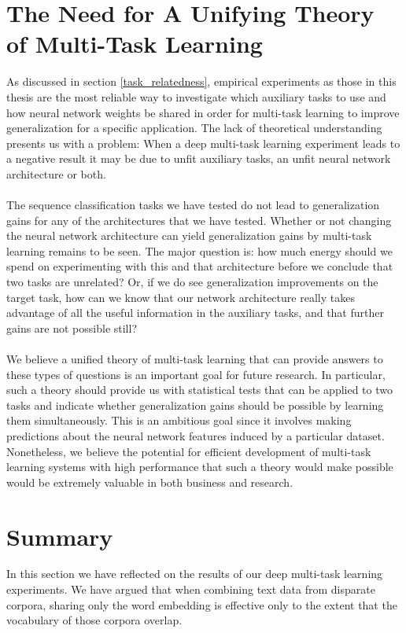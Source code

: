 \section{The Need for A Unifying Theory of Multi-Task Learning}
As discussed in section \ref{task_relatedness}, empirical experiments as those in this thesis are the most reliable way to investigate which auxiliary tasks to use and how neural network weights be shared in order for multi-task learning to improve generalization for a specific application. The lack of theoretical understanding presents us with a problem: When a deep multi-task learning experiment leads to a negative result it may be due to unfit auxiliary tasks, an unfit neural network architecture or both.
\\\\
The sequence classification tasks we have tested do not lead to generalization gains for any of the architectures that we have tested. Whether or not changing the neural network architecture can yield generalization gains by multi-task learning remains to be seen. The major question is: how much energy should we spend on experimenting with this and that architecture before we conclude that two tasks are unrelated? Or, if we do see generalization improvements on the target task, how can we know that our network architecture really takes advantage of all the useful information in the auxiliary tasks, and that further gains are not possible still?
\\\\
We believe a unified theory of multi-task learning that can provide answers to these types of questions is an important goal for future research. In particular, such a theory should provide us with statistical tests that can be applied to two tasks and indicate whether generalization gains should be possible by learning them simultaneously. This is an ambitious goal since it involves making predictions about the neural network features induced by a particular dataset. Nonetheless, we believe the potential for efficient development of multi-task learning systems with high performance that such a theory would make possible would be extremely valuable in both business and research.

\section{Summary}
In this section we have reflected on the results of our deep multi-task learning experiments. We have argued that when combining text data from disparate corpora, sharing only the word embedding is effective only to the extent that the vocabulary of those corpora overlap. 

